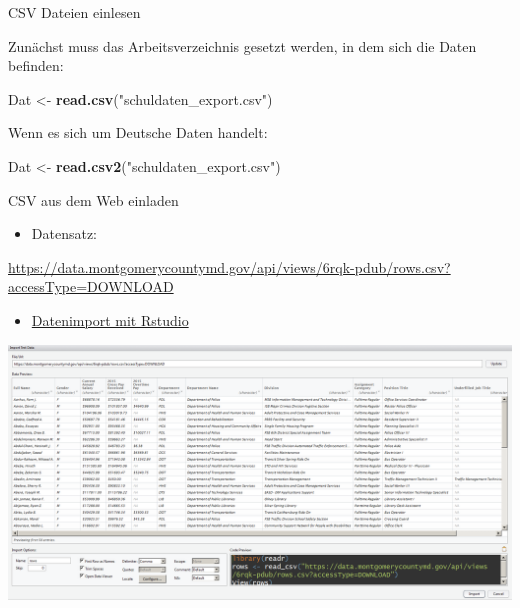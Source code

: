 \documentclass[ignorenonframetext,]{beamer}
\newenvironment{Shaded}{}{}
\newcommand{\KeywordTok}[1]{\textcolor[rgb]{0.00,0.44,0.13}{\textbf{{#1}}}}
\newcommand{\StringTok}[1]{\textcolor[rgb]{0.25,0.44,0.63}{{#1}}}
\newcommand{\NormalTok}[1]{{#1}}
\providecommand{\tightlist}{%
\setlength{\itemsep}{0pt}\setlength{\parskip}{0pt}}
\begin{document}
\begin{frame}[fragile]{CSV Dateien einlesen}

Zunächst muss das Arbeitsverzeichnis gesetzt werden, in dem sich die
Daten befinden:

\begin{Shaded}
\begin{Highlighting}[]
\NormalTok{Dat <-}\StringTok{ }\KeywordTok{read.csv}\NormalTok{(}\StringTok{"schuldaten_export.csv"}\NormalTok{)}
\end{Highlighting}
\end{Shaded}

Wenn es sich um Deutsche Daten handelt:

\begin{Shaded}
\begin{Highlighting}[]
\NormalTok{Dat <-}\StringTok{ }\KeywordTok{read.csv2}\NormalTok{(}\StringTok{"schuldaten_export.csv"}\NormalTok{)}
\end{Highlighting}
\end{Shaded}

\end{frame}

\begin{frame}{CSV aus dem Web einladen}

\begin{itemize}
\tightlist
\item
  Datensatz:
\end{itemize}

\url{https://data.montgomerycountymd.gov/api/views/6rqk-pdub/rows.csv?accessType=DOWNLOAD}

\begin{itemize}
\tightlist
\item
  \href{https://support.rstudio.com/hc/en-us/articles/218611977-Importing-Data-with-RStudio}{Datenimport
  mit Rstudio}
\end{itemize}

\includegraphics{./tex2pdf.956/74bec32bd4334be5ae8e5422ac2c166dd8414ddb.png}

\end{frame}
\end{document}
